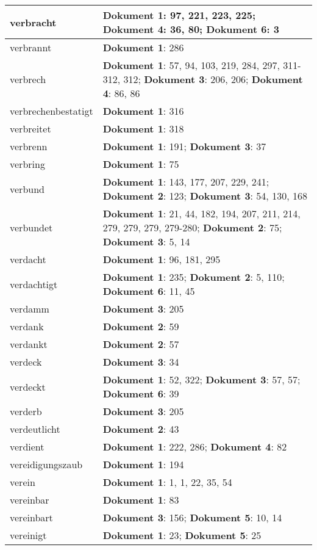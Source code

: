 \documentclass[a5paper]{article}
\begin{document}
\begin{longtable}[l]{|l|p{3in}|}
\hline
verbracht & \textbf{Dokument 1}: 97, 221, 223, 225; \textbf{Dokument 4}: 36, 80; \textbf{Dokument 6}: 3 \\
\hline
verbrannt & \textbf{Dokument 1}: 286 \\
\hline
verbrech & \textbf{Dokument 1}: 57, 94, 103, 219, 284, 297, 311-312, 312; \textbf{Dokument 3}: 206, 206; \textbf{Dokument 4}: 86, 86 \\
\hline
verbrechenbestatigt & \textbf{Dokument 1}: 316 \\
\hline
verbreitet & \textbf{Dokument 1}: 318 \\
\hline
verbrenn & \textbf{Dokument 1}: 191; \textbf{Dokument 3}: 37 \\
\hline
verbring & \textbf{Dokument 1}: 75 \\
\hline
verbund & \textbf{Dokument 1}: 143, 177, 207, 229, 241; \textbf{Dokument 2}: 123; \textbf{Dokument 3}: 54, 130, 168 \\
\hline
verbundet & \textbf{Dokument 1}: 21, 44, 182, 194, 207, 211, 214, 279, 279, 279, 279-280; \textbf{Dokument 2}: 75; \textbf{Dokument 3}: 5, 14 \\
\hline
verdacht & \textbf{Dokument 1}: 96, 181, 295 \\
\hline
verdachtigt & \textbf{Dokument 1}: 235; \textbf{Dokument 2}: 5, 110; \textbf{Dokument 6}: 11, 45 \\
\hline
verdamm & \textbf{Dokument 3}: 205 \\
\hline
verdank & \textbf{Dokument 2}: 59 \\
\hline
verdankt & \textbf{Dokument 2}: 57 \\
\hline
verdeck & \textbf{Dokument 3}: 34 \\
\hline
verdeckt & \textbf{Dokument 1}: 52, 322; \textbf{Dokument 3}: 57, 57; \textbf{Dokument 6}: 39 \\
\hline
verderb & \textbf{Dokument 3}: 205 \\
\hline
verdeutlicht & \textbf{Dokument 2}: 43 \\
\hline
verdient & \textbf{Dokument 1}: 222, 286; \textbf{Dokument 4}: 82 \\
\hline
vereidigungszaub & \textbf{Dokument 1}: 194 \\
\hline
verein & \textbf{Dokument 1}: 1, 1, 22, 35, 54 \\
\hline
vereinbar & \textbf{Dokument 1}: 83 \\
\hline
vereinbart & \textbf{Dokument 3}: 156; \textbf{Dokument 5}: 10, 14 \\
\hline
vereinigt & \textbf{Dokument 1}: 23; \textbf{Dokument 5}: 25 \\

\end{longtable}
\end{document}
